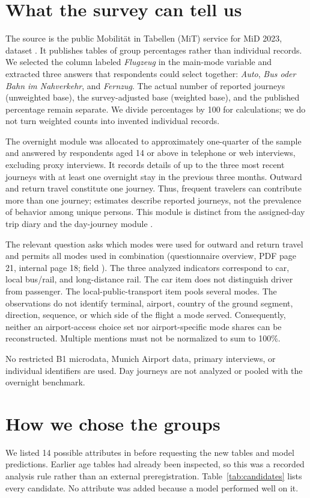 \documentclass{article}
\newcommand{\code}[1]{\texttt{\detokenize{#1}}}
\begin{document}
\section{What the survey can tell us}
The source is the public Mobilit\"at in Tabellen (MiT) service for MiD 2023, dataset \code{reise}. It publishes tables of group percentages rather than individual records. We selected the column labeled \emph{Flugzeug} in the main-mode variable and extracted three answers that respondents could select together: \emph{Auto}, \emph{Bus oder Bahn im Nahverkehr}, and \emph{Fernzug}. The actual number of reported journeys (unweighted base), the survey-adjusted base (weighted base), and the published percentage remain separate. We divide percentages by 100 for calculations; we do not turn weighted counts into invented individual records.

The overnight module was allocated to approximately one-quarter of the sample and answered by respondents aged 14 or above in telephone or web interviews, excluding proxy interviews. It records details of up to the three most recent journeys with at least one overnight stay in the previous three months. Outward and return travel constitute one journey. Thus, frequent travelers can contribute more than one journey; estimates describe reported journeys, not the prevalence of behavior among unique persons. This module is distinct from the assigned-day trip diary and the day-journey module \citep{midhandbook2025,midquestionnaire2025}.

The relevant question asks which modes were used for outward and return travel and permits all modes used in combination (questionnaire overview, PDF page 21, internal page 18; field \code{R_VM_A-N}). The three analyzed indicators correspond to car, local bus/rail, and long-distance rail. The car item does not distinguish driver from passenger. The local-public-transport item pools several modes. The observations do not identify terminal, airport, country of the ground segment, direction, sequence, or which side of the flight a mode served. Consequently, neither an airport-access choice set nor airport-specific mode shares can be reconstructed. Multiple mentions must not be normalized to sum to 100\%.

No restricted B1 microdata, Munich Airport data, primary interviews, or individual identifiers are used. Day journeys are not analyzed or pooled with the overnight benchmark.

\section{How we chose the groups}
We listed 14 possible attributes in \code{selection_protocol.json} before requesting the new tables and model predictions. Earlier age tables had already been inspected, so this was a recorded analysis rule rather than an external preregistration. Table~\ref{tab:candidates} lists every candidate. No attribute was added because a model performed well on it.
\end{document}
